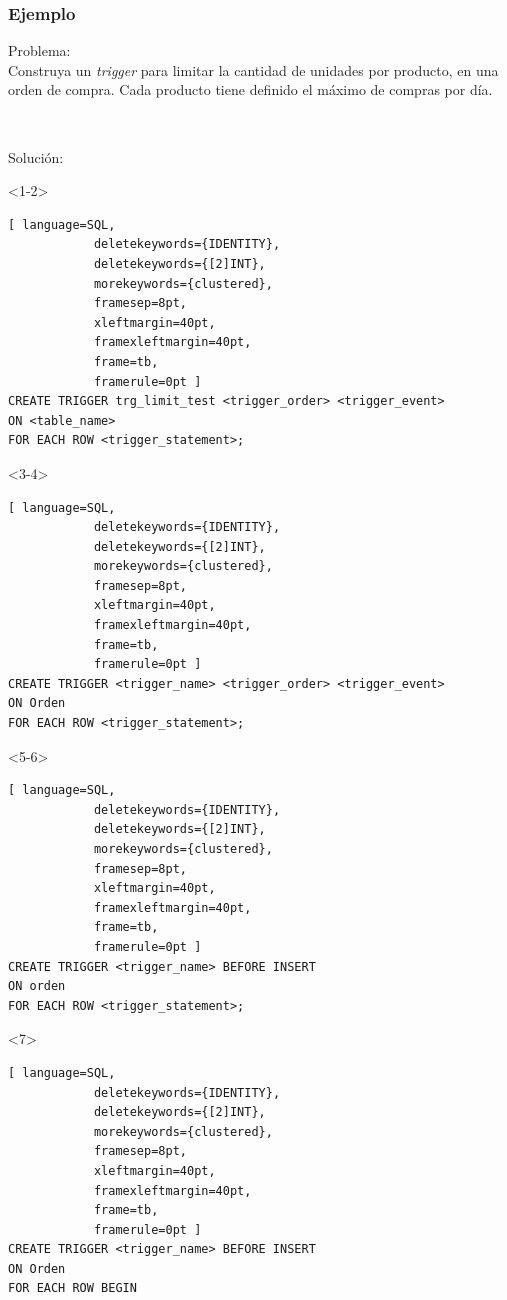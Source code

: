 \documentclass[
	10pt, %
	aspectratio=169, %
]{beamer}
\begin{document}
\begin{frame}[fragile]
	
	\frametitle{Ejemplo}
	
	Problema: \\
	Construya un \emph{trigger} para limitar la cantidad de unidades por producto, en una orden de compra. Cada producto tiene definido el máximo de compras por día.
	
	\ 
	
	Solución: \\
	
	\begin{onlyenv}<1-2>
		\begin{lstlisting}[ language=SQL,
			deletekeywords={IDENTITY},
			deletekeywords={[2]INT},
			morekeywords={clustered},
			framesep=8pt,
			xleftmargin=40pt,
			framexleftmargin=40pt,
			frame=tb,
			framerule=0pt ]
CREATE TRIGGER trg_limit_test <trigger_order> <trigger_event> 
ON <table_name> 
FOR EACH ROW <trigger_statement>;
\end{lstlisting}
	\end{onlyenv}

	\begin{onlyenv}<3-4>
		\begin{lstlisting}[ language=SQL,
			deletekeywords={IDENTITY},
			deletekeywords={[2]INT},
			morekeywords={clustered},
			framesep=8pt,
			xleftmargin=40pt,
			framexleftmargin=40pt,
			frame=tb,
			framerule=0pt ]
CREATE TRIGGER <trigger_name> <trigger_order> <trigger_event> 
ON Orden
FOR EACH ROW <trigger_statement>;
\end{lstlisting}
	\end{onlyenv}
	
	\begin{onlyenv}<5-6>
		\begin{lstlisting}[ language=SQL,
			deletekeywords={IDENTITY},
			deletekeywords={[2]INT},
			morekeywords={clustered},
			framesep=8pt,
			xleftmargin=40pt,
			framexleftmargin=40pt,
			frame=tb,
			framerule=0pt ]
CREATE TRIGGER <trigger_name> BEFORE INSERT 
ON orden
FOR EACH ROW <trigger_statement>;
\end{lstlisting}
	\end{onlyenv}
	
		\begin{onlyenv}<7>
		\begin{lstlisting}[ language=SQL,
			deletekeywords={IDENTITY},
			deletekeywords={[2]INT},
			morekeywords={clustered},
			framesep=8pt,
			xleftmargin=40pt,
			framexleftmargin=40pt,
			frame=tb,
			framerule=0pt ]
CREATE TRIGGER <trigger_name> BEFORE INSERT 
ON Orden
FOR EACH ROW BEGIN


\end{lstlisting}
\end{onlyenv}
\end{frame}
\end{document}
